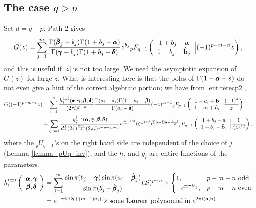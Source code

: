 \documentclass[12pt]{article}
\newcommand{\ee}[0] {e}
\newcommand{\ii}[0] {i}
\numberwithin{equation}{section}
\newcommand{\FF}[6] {{}_{#1}{#2}_{#3} \left( \begin{array}{c} #4 \\ #5 \end{array} \Big| #6  \right)}
\newcommand{\bfa}[0] {\mathbf{a}}
\newcommand{\bfb}[0] {\mathbf{b}}
\begin{document}
\subsection{The case $q>p$}
Set $d = q-p$. Path 2 gives
\begin{equation}
\label{eq_Gpath2}
G(z) = \sum_{j=1}^{m} \frac{\Gamma(\hat{\bfbeta}_j - b_j)\Gamma(1+b_j-\bfalpha)}{\Gamma(\bfgamma-b_j)\Gamma(1+b_j-\bfdelta)} z^{b_j}\FF{p}{F}{q-1}{1+b_j-\bfa}{1+b_j-\hat{\bfb}_j}{(-1)^{p-m-n}z}\text{,}
\end{equation}
and this is useful if $|z|$ is not too large. We need the asymptotic expansion of $G(z)$ for large $z$. What is interesting here is that the poles of $\Gamma(1-\pmb{\alpha}+s)$ do not even give a hint of the correct algebraic portion; we have from \eqref{entirerecp2},
\begin{align*}
G((-1)^{p-m-n}z) &= \sum_{i=1}^{n} \frac{h_{i}^{(\pm)}(\bfalpha, \bfgamma; \bfbeta, \bfdelta)}{(2\pi \ii)^{p-n} } \frac{\Gamma(a_i-\hat{\bfa}_i)\Gamma(1-a_i+\bfbeta)}{\Gamma(a_i-\bfdelta)} (-z)^{a_i-1}\FF{q}{F}{p-1}{1-a_i+\bfb}{1-a_i+\hat{\bfa}_i}{\frac{(-1)^{d}}{z}}\\
&+\sum_{\zeta^d=1} \frac{g_{\zeta}^{(\pm)}(\bfalpha, \bfgamma; \bfbeta, \bfdelta)}{d^{\frac{1}{2}} (2\pi)^{\frac{d-1}{2}} (2\pi \ii)^{1+p-m-n}} \ee^{d \zeta z^{1/d}}(\zeta z^{1/d})^{\Sigma \bfb - \Sigma \bfa - \frac{d-1}{2}} \FF{p}{U}{q-1}{1+b_j-\bfa}{1+b_j-\hat{\bfb}_j}{\frac{1}{\zeta z^{1/d}}}\text{,}
\end{align*}
where the ${}_p U_{q-1}$'s on the right hand side are independent of the choice of $j$ (Lemma \ref{lemma_pUq_inv}), and the $h_i$ and $g_{\zeta}$ are entire functions of the parameters.
\begin{align*}
h_{i}^{(\pm)}\left(\begin{array}{c} \bfalpha, \bfgamma \\ \bfbeta, \bfdelta \end{array}\right) &= \sum_{j=1}^{m} \frac{\sin \pi (b_j-\bfgamma) \sin \pi (a_i-\hat{\bfbeta}_j)}{\sin \pi (b_j-\hat{\bfbeta}_j)} (2 \ii)^{p-n} \times \begin{cases} 1\text{,}& p-m-n \text{ odd}\\
-\ee^{\pm \pi \ii b_j}\text{,}& p-m-n \text{ even}\end{cases}\\
&= \ee^{-\pi \ii (\Sigma \bfgamma + (m-1) a_i)} \times \text{some Laurent polynomial in } \ee^{2\pi \ii (\bfa, \bfb)}
\end{align*}
\end{document}
